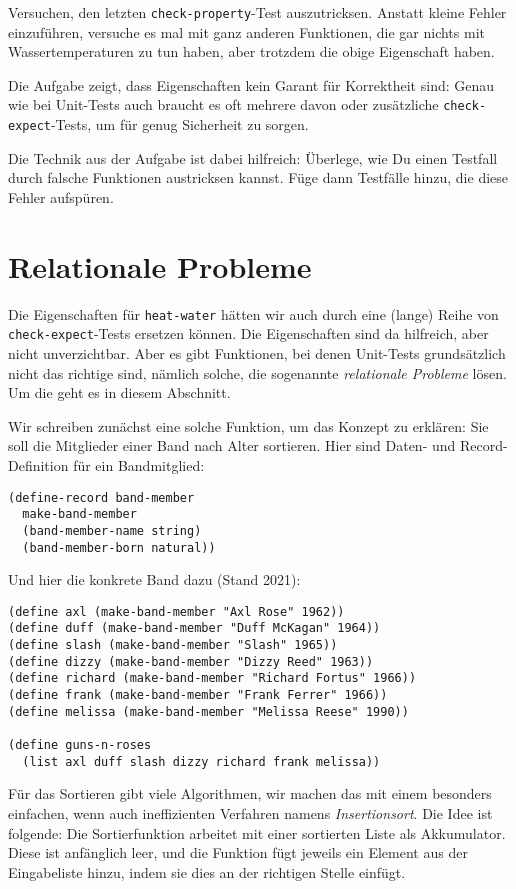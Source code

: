 \begin{aufgabeinline}
  Versuchen, den letzten \lstinline{check-property}-Test
  auszutricksen.  Anstatt kleine Fehler einzuführen, versuche es mal
  mit ganz anderen Funktionen, die gar nichts mit Wassertemperaturen
  zu tun haben, aber trotzdem die obige Eigenschaft haben.
\end{aufgabeinline}
%
Die Aufgabe zeigt, dass Eigenschaften kein Garant für Korrektheit
sind: Genau wie bei Unit-Tests auch braucht es oft mehrere davon oder
zusätzliche \lstinline{check-expect}-Tests, um für genug Sicherheit zu
sorgen.

Die Technik aus der Aufgabe ist dabei hilfreich: Überlege, wie Du
einen Testfall durch falsche Funktionen austricksen kannst.  Füge dann
Testfälle hinzu, die diese Fehler aufspüren.



\section{Relationale Probleme}

%
Die Eigenschaften für \lstinline{heat-water} hätten wir auch durch
eine (lange) Reihe von \lstinline{check-expect}-Tests ersetzen können.
Die Eigenschaften sind da hilfreich, aber nicht unverzichtbar.  Aber
es gibt Funktionen, bei denen Unit-Tests grundsätzlich nicht das
richtige sind, nämlich solche, die sogenannte \textit{relationale
  Probleme} lösen.  Um die geht es in diesem Abschnitt.

Wir schreiben zunächst eine solche Funktion, um das Konzept zu
erklären: Sie soll die Mitglieder einer Band nach Alter sortieren.
Hier sind Daten- und Record-Definition für ein Bandmitglied:
%
\begin{lstlisting}
(define-record band-member
  make-band-member
  (band-member-name string)
  (band-member-born natural))
\end{lstlisting}
%
Und hier die konkrete Band dazu (Stand 2021):
%
\begin{lstlisting}
(define axl (make-band-member "Axl Rose" 1962))
(define duff (make-band-member "Duff McKagan" 1964))
(define slash (make-band-member "Slash" 1965))
(define dizzy (make-band-member "Dizzy Reed" 1963))
(define richard (make-band-member "Richard Fortus" 1966))
(define frank (make-band-member "Frank Ferrer" 1966))
(define melissa (make-band-member "Melissa Reese" 1990))

(define guns-n-roses
  (list axl duff slash dizzy richard frank melissa))
\end{lstlisting}
%
Für das Sortieren gibt viele Algorithmen, wir machen das mit einem
besonders einfachen, wenn auch ineffizienten Verfahren namens
\textit{Insertionsort}.  Die Idee ist folgende:
Die Sortierfunktion arbeitet mit einer sortierten Liste als
Akkumulator.  Diese ist anfänglich leer, und die Funktion fügt jeweils
ein Element aus der Eingabeliste hinzu, indem sie dies an der
richtigen Stelle einfügt.

